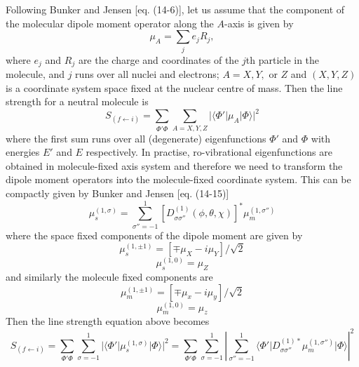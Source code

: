 Following Bunker and Jensen \citep{Bunker} [eq. (14-6)], 
let us assume that the component of the molecular dipole moment operator along the $A$-axis 
is given by
\begin{equation}
\mu_A = \sum_j e_j R_j,
\end{equation}
where $e_j$ and $R_j$ are the charge and coordinates of the $j$th particle in the molecule,
and $j$ runs over all nuclei and electrons; $A = X, Y,$ or $Z$ and 
$(X, Y, Z)$ is a coordinate system space fixed at the 
nuclear %
centre of mass.
Then the line strength for a neutral molecule is
\begin{equation}
S_{(f \leftarrow i)} = \sum_{\Phi' \Phi} \sum_{A=X, Y, Z}    %
\vert \langle \Phi' \vert \mu_A \vert \Phi \rangle \vert^2
\end{equation}
where the first sum runs over all (degenerate) eigenfunctions $\Phi'$ and $\Phi$ with energies 
$E'$ and $E$ respectively.
In practise, ro-vibrational eigenfunctions are obtained in molecule-fixed axis system
and therefore we need to transform the dipole moment operators into the molecule-fixed
coordinate system. This can be compactly given by Bunker and Jensen \citep{Bunker} [eq. (14-15)]
\begin{equation}
\mu^{(1,\sigma)}_s = \sum^1_{\sigma''=-1} \left[ D^{(1)}_{\sigma \sigma''}(\phi, \theta, \chi)\right]^*
\mu^{(1, \sigma'')}_m
\end{equation}
where the space fixed components of the dipole moment are given by
\begin{equation}
\mu^{(1,\pm 1)}_s = \left[ \mp \mu_X - i \mu_Y \right]/\sqrt{2}
\end{equation}
\begin{equation}
\mu^{(1,0)}_s = \mu_Z
\end{equation}
and similarly the molecule fixed components are 
\begin{equation}
\mu^{(1,\pm 1)}_m = \left[ \mp \mu_x - i \mu_y \right]/\sqrt{2}
\end{equation}
\begin{equation}
\mu^{(1,0)}_m = \mu_z
\end{equation}
Then the line strength equation above becomes
\begin{equation}
S_{(f \leftarrow i)} = \sum_{\Phi' \Phi} \sum^{1}_{\sigma = -1}
\vert \langle \Phi' \vert \mu^{(1,\sigma)}_s \vert \Phi \rangle \vert^2
= \sum_{\Phi' \Phi} \sum^{1}_{\sigma = -1} 
\left\vert 
\sum^{1}_{\sigma'' = -1}  
\langle \Phi' \vert D^{(1)*}_{\sigma \sigma''}
\mu^{(1,\sigma'')}_m \vert \Phi \rangle \right\vert^2
\end{equation}

